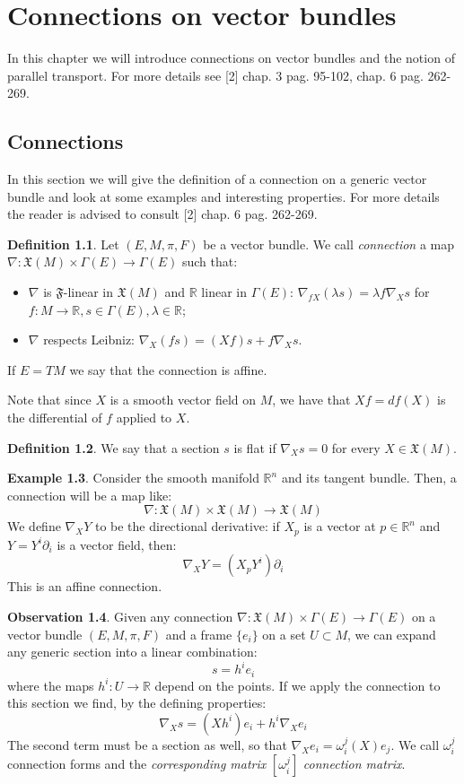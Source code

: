 \documentclass[12pt,a4paper]{report}
\theoremstyle{definition}
\newtheorem{Def}{Definition}[chapter]
\theoremstyle{Theorem}
\theoremstyle{definition}
\newtheorem{Ex}[Def]{Example}
\theoremstyle{definition}
\newtheorem{Obs}[Def]{Observation}
\begin{document}
	\chapter{Connections on vector bundles}
	In this chapter we will introduce connections on vector bundles and the notion of parallel transport. For more details see [2] chap. 3 pag. 95-102, chap. 6 pag. 262-269.
	\section{Connections}
	In this section we will give the definition of a connection on a generic vector bundle and look at some examples and interesting properties. For more details the reader is advised to consult [2] chap. 6 pag. 262-269.
	\begin{Def}\label{Def_5.7}
		Let $(E,M,\pi,F)$ be a vector bundle. We call \textit{connection} a map $\nabla:\mathfrak{X}(M)\times\Gamma(E)\rightarrow\Gamma(E)$ such that:
		\begin{itemize}
			\item $\nabla$ is $\mathfrak{F}$-linear in $\mathfrak{X}(M)$ and $\mathbb{R}$ linear in $\Gamma(E)$: $\nabla_{fX}(\lambda s)=\lambda f\nabla_X s$ for $f:M\rightarrow \mathbb{R}, s\in\Gamma(E),\lambda\in\mathbb{R}$;
			\item $\nabla$ respects Leibniz: $\nabla_X (fs)=(Xf)s+f\nabla_X s$.
		\end{itemize}
		If $E=TM$ we say that the connection is affine.
	\end{Def}
	Note that since $X$ is a smooth vector field on $M$, we have that $Xf=df(X)$ is the differential of $f$ applied to $X$.
	\begin{Def}\label{Def_5.8}
		We say that a section $s$ is flat if $\nabla_X s=0$ for every $X\in \mathfrak{X}(M)$.
	\end{Def}
	\begin{Ex}
		Consider the smooth manifold $\mathbb{R}^n$ and its tangent bundle. Then, a connection will be a map like:
		$$\nabla:\mathfrak{X}(M)\times\mathfrak{X}(M)\rightarrow\mathfrak{X}(M)$$
		We define $\nabla_XY$ to be the directional derivative: if $X_p$ is a vector at $p\in\mathbb{R}^n$ and $Y=Y^i\partial_i$ is a vector field, then:
		$$\nabla_XY=(X_pY^i)\partial_i$$
		This is an affine connection.
	\end{Ex}
	\begin{Obs}
		Given any connection $\nabla:\mathfrak{X}(M)\times\Gamma(E)\rightarrow\Gamma(E)$ on a vector bundle $(E,M,\pi,F)$ and a frame $\{e_i\}$ on a set $U\subset M$, we can expand any generic section into a linear combination:
		$$s=h^ie_i$$
		where the maps $h^i:U\rightarrow \mathbb{R}$ depend on the points. If we apply the connection to this section we find, by the defining properties:
		$$\nabla_Xs=(Xh^i)e_i+h^i\nabla_Xe_i$$
		The second term must be a section as well, so that $\nabla_Xe_i=\omega^j_i(X)e_j$. We call $\omega^j_i$ connection forms and the \textit{corresponding matrix} $[\omega^j_i]$ \textit{connection matrix}. 
	\end{Obs}
\end{document}
